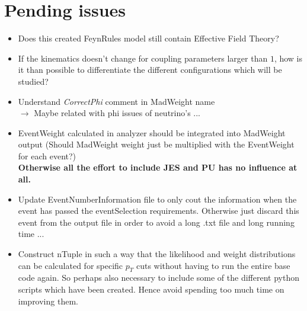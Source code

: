 \documentclass[a4paper,12pt]{book}
\date{Started 4 April 2014 \\ Version: \today}
\begin{document}
\setcounter{secnumdepth}{3} %
\setcounter{tocdepth}{3}    %

\maketitle
\tableofcontents
\newpage

\chapter{Pending issues}
\begin{itemize}
  \item Does this created FeynRules model still contain Effective Field Theory?
  \item If the kinematics doesn't change for coupling parameters larger than $1$, how is it than possible to differentiate the different configurations which will be studied?
  \item Understand \textit{CorrectPhi} comment in MadWeight name \\ $\rightarrow$ Maybe related with phi issues of neutrino's ...
  \item EventWeight calculated in analyzer should be integrated into MadWeight output (Should MadWeight weight just be multiplied with the EventWeight for each event?) \\ \textbf{Otherwise all the effort to include JES and PU has no influence at all.							}
  \item Update EventNumberInformation file to only cout the information when the event has passed the eventSelection requirements. Otherwise just discard this event from the output file in order to avoid a long .txt file and long running time ...
  \item Construct nTuple in such a way that the likelihood and weight distributions can be calculated for specific $p_T$ cuts without having to run the entire base code again. So perhaps also necessary to include some of the different python scripts which have been created. Hence avoid spending too much time on improving them.

\end{itemize}
\end{document}
